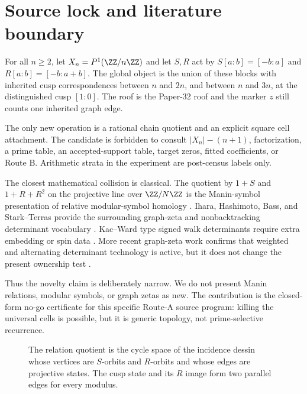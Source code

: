 \section{Source lock and literature boundary}
\label{sec:source}

\begin{definition}
For all $n\ge2$, let $X_n=P^1(\ZZ/n\ZZ)$ and let $S,R$ act by
$S[a:b]=[-b:a]$ and $R[a:b]=[-b:a+b]$.  The global object is the union of
these blocks with inherited cusp correspondences between $n$ and $2n$, and
between $n$ and $3n$, at the distinguished cusp $[1:0]$.  The roof is the
Paper-32 roof and the marker $z$ still counts one inherited graph edge.
\end{definition}

The only new operation is a rational chain quotient and an explicit square
cell attachment.  The candidate is forbidden to consult $|X_n|-(n+1)$,
factorization, a prime table, an accepted-support table, target zeros, fitted
coefficients, or Route B.  Arithmetic strata in the experiment are
post-census labels only.

The closest mathematical collision is classical.  The quotient by
$1+S$ and $1+R+R^2$ on the projective line over $\ZZ/N\ZZ$ is the Manin-symbol
presentation of relative modular-symbol homology \citep{manin1972,merel1991}.
Ihara, Hashimoto, Bass, and Stark--Terras provide the surrounding graph-zeta
and nonbacktracking determinant vocabulary
\citep{ihara1966,hashimoto1989,bass1992,starkterras1996}.  Kac--Ward type
signed walk determinants require extra embedding or spin data
\citep{kacward1952,cimasoni2010}.  More recent graph-zeta work confirms that
weighted and alternating determinant technology is active, but it does not
change the present ownership test \citep{lau2025,ishikawa2026,lu2026}.

Thus the novelty claim is deliberately narrow.  We do not present Manin
relations, modular symbols, or graph zetas as new.  The contribution is the
closed-form no-go certificate for this specific Route-A source program:
killing the universal cells is possible, but it is generic topology, not
prime-selective recurrence.

\begin{figure}[t]
  \centering
  
  \caption{The relation quotient is the cycle space of the incidence dessin
  whose vertices are $S$-orbits and $R$-orbits and whose edges are projective
  states.  The cusp state and its $R$ image form two parallel edges for every
  modulus.}
  \label{fig:dessin}
\end{figure}

